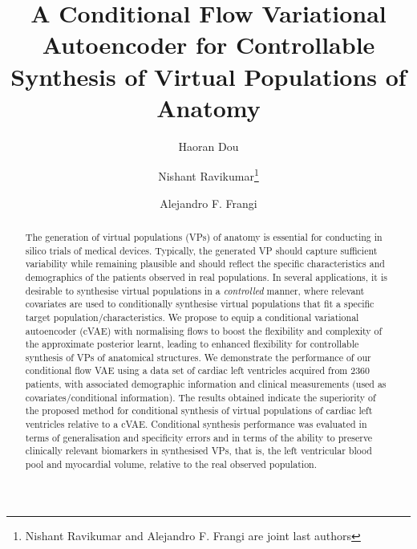 \documentclass[runningheads]{llncs}
\begin{document}
%
\title{A Conditional Flow Variational Autoencoder for Controllable Synthesis of Virtual Populations of Anatomy}
%
%
\author{Haoran Dou \and
Nishant Ravikumar\thanks{Nishant Ravikumar and Alejandro F. Frangi are joint last authors} \and
Alejandro F. Frangi}
%
%
%
\maketitle              %
%
\begin{abstract}
The generation of virtual populations (VPs) of anatomy is essential for conducting in silico trials of medical devices. Typically, the generated VP should capture sufficient variability while remaining plausible and should reflect the specific characteristics and demographics of the patients observed in real populations. In several applications, it is desirable to synthesise virtual populations in a \textit{controlled} manner, where relevant covariates are used to conditionally synthesise virtual populations that fit a specific target population/characteristics. 
We propose to equip a conditional variational autoencoder (cVAE) with normalising flows to boost the flexibility and complexity of the approximate posterior learnt, leading to enhanced flexibility for controllable synthesis of VPs of anatomical structures. We demonstrate the performance of our conditional flow VAE using a data set of cardiac left ventricles acquired from 2360 patients, with associated demographic information and clinical measurements (used as covariates/conditional information). 
The results obtained indicate the superiority of the proposed method for conditional synthesis of virtual populations of cardiac left ventricles relative to a cVAE. Conditional synthesis performance was evaluated in terms of generalisation and specificity errors and in terms of the ability to preserve clinically relevant biomarkers in synthesised VPs, that is, the left ventricular blood pool and myocardial volume, relative to the real observed population.
\end{abstract}
%
%
%
\end{document}
